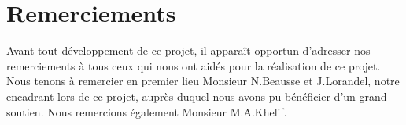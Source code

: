 \documentclass[11pt, french]{article}
\begin{document}


\tableofcontents
\listoffigures

\section*{Remerciements}
Avant tout développement de ce projet, il apparaît opportun d'adresser nos remerciements à tous ceux qui nous ont aidés pour la réalisation de ce projet. Nous tenons à remercier en premier lieu Monsieur N.Beausse et J.Lorandel, notre encadrant lors de ce projet, auprès duquel nous avons pu bénéficier d'un grand soutien. Nous remercions également Monsieur M.A.Khelif.

\clearpage

\clearpage

\clearpage

\clearpage

\clearpage

\clearpage

\clearpage


%
%
\end{document}

